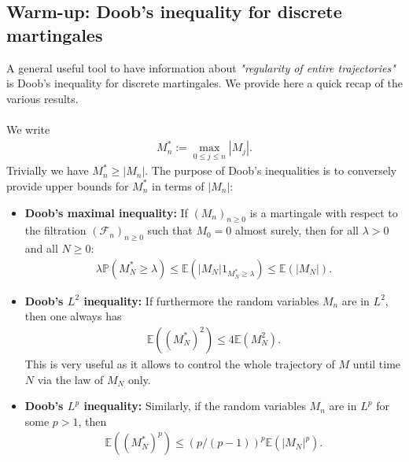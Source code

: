 \documentclass[../mainfile.tex]{subfiles}
\begin{document}
\subsection{Warm-up: Doob's inequality for discrete martingales}
A general useful tool to have information about \textit{"regularity of entire trajectories"} is Doob's inequality for discrete martingales. We provide here a quick recap of the various results. 
\\\\
We write 
\begin{align*}
M_n^*:= \max_{0 \leq j \leq n} |M_j|.
\end{align*}
Trivially we have $M_n^* \geq |M_n|$. The purpose of Doob's inequalities is to conversely provide upper bounds for $M_n^*$ in terms of $|M_n|:$
\begin{itemize}
\item \textbf{Doob's maximal inequality:} If $(M_n)_{n \geq 0}$ is a martingale with respect to the filtration $( \mathcal{F}_n)_{n \geq 0}$ such that $M_0=0$ almost surely, then for all $\lambda >0$ and all $N \geq 0 $: 
\begin{align*}
\lambda \mathbb{P}( M_N^* \geq \lambda) \leq \mathbb{E}(|M_N|1_{M_N^* \geq \lambda}) \leq \mathbb{E}(|M_N|).
\end{align*}
\item \textbf{Doob's $L^2$ inequality:} If furthermore the random variables $M_n$ are in $L^2$, then one always has
\begin{align*}
\mathbb{E}((M_N^*)^2) \leq 4 \mathbb{E}(M_N^2). 
\end{align*}
This is very useful as it allows to control the whole trajectory of $M$ until time $N$ via the law of $M_N$ only. 
\item \textbf{Doob's $L^p$ inequality:} Similarly, if the random variables $M_n$ are in $L^p$ for some $p >1$, then
\begin{align*}
\mathbb{E}((M_N^*)^p) \leq (p/(p-1))^p \mathbb{E}(|M_N|^p). 
\end{align*}
\end{itemize} 
\newpage
\end{document}
